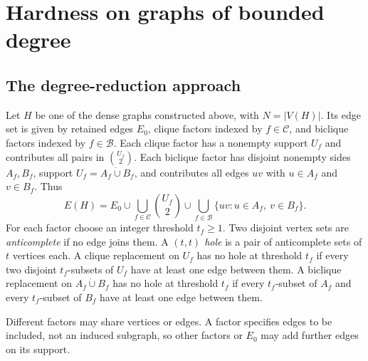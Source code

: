 \section{Hardness on graphs of bounded degree}
\label{sec:bounded-degree-hardness}

\subsection{The degree-reduction approach}

Let $H$ be one of the dense graphs constructed above, with
$N=|V(H)|$. Its edge set is given by retained edges $E_0$, clique
factors indexed by $f\in\mathcal C$, and biclique factors indexed by
$f\in\mathcal B$. Each clique factor has a nonempty support $U_f$ and contributes
all pairs in $\binom{U_f}{2}$. Each biclique factor has disjoint nonempty sides
$A_f,B_f$, support $U_f=A_f\mathbin{\dot\cup}B_f$, and contributes
all edges $uv$ with $u\in A_f$ and $v\in B_f$. Thus
\begin{equation}\label{eq:factor-edge-union}
 E(H)=E_0\cup\bigcup_{f\in\mathcal C}\binom{U_f}{2}
       \cup\bigcup_{f\in\mathcal B}\{uv:u\in A_f,\ v\in B_f\}.
\end{equation}
For each factor choose an integer threshold $t_f\ge1$. Two
disjoint vertex sets are \emph{anticomplete} if no edge joins them.
A \emph{$(t,t)$ hole} is a pair of anticomplete sets of $t$ vertices
each. A clique replacement on $U_f$ has no hole at threshold $t_f$
if every two disjoint $t_f$-subsets of $U_f$ have at least one edge
between them. A biclique replacement on
$A_f\mathbin{\dot\cup}B_f$ has no hole at threshold $t_f$ if every
$t_f$-subset of $A_f$ and every $t_f$-subset of $B_f$ have at least
one edge between them.

Different factors may share vertices or edges. A factor specifies
edges to be included, not an induced subgraph, so other factors or
$E_0$ may add further edges on its support.

